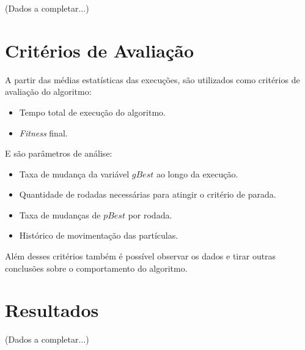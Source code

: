 (Dados a completar...)
% 


\section{Critérios de Avaliação}
A partir das médias estatísticas das execuções, são utilizados como critérios de avaliação do algoritmo: \hfill
\begin{itemize}
\item Tempo total de execução do algoritmo.
\item \textit{Fitness} final.
\end{itemize}

\noindent E são parâmetros de análise:\hfill
\begin{itemize}
\item Taxa de mudança da variável $gBest$ ao longo da execução.
\item Quantidade de rodadas necessárias para atingir o critério de parada.
\item Taxa de mudanças de $pBest$ por rodada.
\item Histórico de movimentação das partículas.
\end{itemize}

Além desses critérios também é possível observar os dados e tirar outras conclusões sobre o comportamento do algoritmo.\hfill

%


\section{Resultados}
(Dados a completar...)
%

